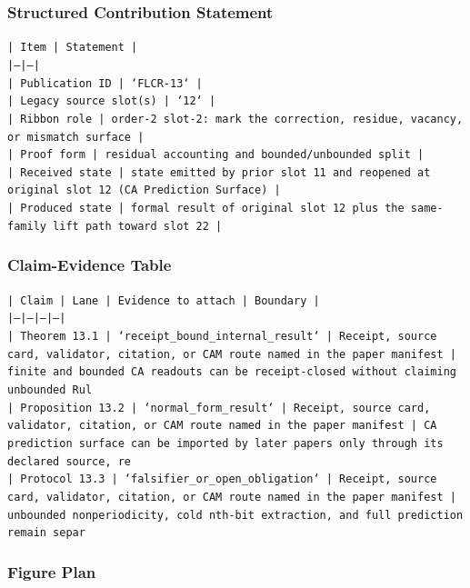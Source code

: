 \documentclass[11pt]{article}
\begin{document}
\subsubsection*{Structured Contribution Statement}

\noindent\texttt{| Item | Statement |}\\
\noindent\texttt{|---|---|}\\
\noindent\texttt{| Publication ID | `FLCR-13` |}\\
\noindent\texttt{| Legacy source slot(s) | `12` |}\\
\noindent\texttt{| Ribbon role | order-2 slot-2: mark the correction, residue, vacancy, or mismatch surface |}\\
\noindent\texttt{| Proof form | residual accounting and bounded/unbounded split |}\\
\noindent\texttt{| Received state | state emitted by prior slot 11 and reopened at original slot 12 (CA Prediction Surface) |}\\
\noindent\texttt{| Produced state | formal result of original slot 12 plus the same-family lift path toward slot 22 |}\\

\subsubsection*{Claim-Evidence Table}

\noindent\texttt{| Claim | Lane | Evidence to attach | Boundary |}\\
\noindent\texttt{|---|---|---|---|}\\
\noindent\texttt{| Theorem 13.1 | `receipt\_bound\_internal\_result` | Receipt, source card, validator, citation, or CAM route named in the paper manifest | finite and bounded CA readouts can be receipt-closed without claiming unbounded Rul}\\
\noindent\texttt{| Proposition 13.2 | `normal\_form\_result` | Receipt, source card, validator, citation, or CAM route named in the paper manifest | CA prediction surface can be imported by later papers only through its declared source, re}\\
\noindent\texttt{| Protocol 13.3 | `falsifier\_or\_open\_obligation` | Receipt, source card, validator, citation, or CAM route named in the paper manifest | unbounded nonperiodicity, cold nth-bit extraction, and full prediction remain separ}\\

\subsubsection*{Figure Plan}
\end{document}
